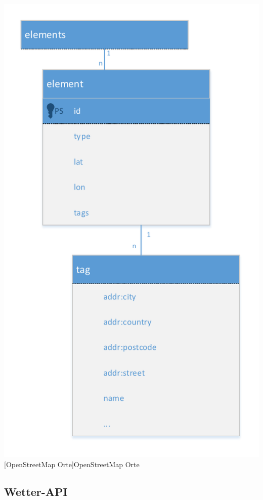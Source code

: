 \documentclass[a4paper,12pt]{scrartcl}
\makeatletter
\def\ScaleIfNeeded{%
\ifdim\Gin@nat@width>\linewidth
\linewidth
\else
\Gin@nat@width
\fi
}
\makeatother
\begin{document}
\begin{center}
\centering
\includegraphics[width=\ScaleIfNeeded]{../OSM.pdf}%
[OpenStreetMap Orte]{OpenStreetMap Orte}%
\end{center}



\subsection{Wetter-API}
\end{document}
